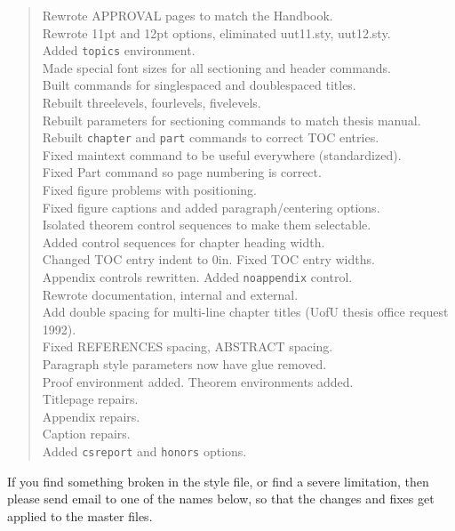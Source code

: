 \begin{quote}
Rewrote APPROVAL pages to match the Handbook.\\
Rewrote 11pt and 12pt options, eliminated uut11.sty, uut12.sty. \\
Added {\tt topics} environment. \\
Made special font sizes for all sectioning and header commands. \\
Built commands for singlespaced and doublespaced titles. \\
Rebuilt threelevels, fourlevels, fivelevels. \\
Rebuilt parameters for sectioning commands to match thesis manual. \\
Rebuilt {\tt chapter} and {\tt part} commands to correct TOC entries. \\
Fixed maintext command to be useful everywhere (standardized). \\
Fixed Part command so page numbering is correct. \\
Fixed figure problems with positioning. \\
Fixed figure captions and added paragraph/centering options. \\
Isolated theorem control sequences to make them selectable. \\
Added control sequences for chapter heading width. \\
Changed TOC entry indent to 0in. Fixed TOC entry widths. \\
Appendix controls rewritten. Added {\tt noappendix} control. \\
Rewrote documentation, internal and external. \\
Add double spacing for multi-line chapter titles (UofU
thesis office request 1992).\\
Fixed REFERENCES spacing, ABSTRACT spacing. \\
Paragraph style parameters now have glue removed.\\
Proof environment added. Theorem environments added. \\
Titlepage repairs. \\
Appendix repairs. \\
Caption repairs.\\
Added {\tt csreport} and {\tt honors} options.
\end{quote}

If you find something broken in the style file, or find a severe
limitation, then please send email to one of the names below, so that
the changes and fixes get applied to the master files.

